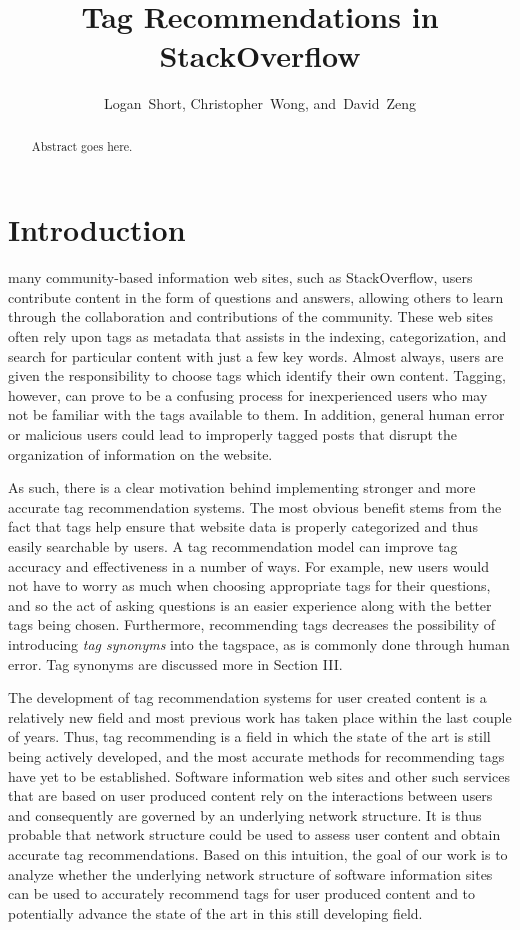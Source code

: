 \documentclass[11pt]{IEEEtran}
\begin{document}
\title{Tag Recommendations in StackOverflow}
\author{Logan~Short, Christopher~Wong, and~David~Zeng}%
\maketitle

\begin{abstract}
Abstract goes here.
\end{abstract}

\section{Introduction}

 many community-based information web sites, such as StackOverflow, users contribute content in the form of questions and answers, allowing others to learn through the collaboration and contributions of the community. These web sites often rely upon tags as metadata that assists in the indexing, categorization, and search for particular content with just a few key words. Almost always, users are given the responsibility to choose tags which identify their own content. Tagging, however, can prove to be a confusing process for inexperienced users who may not be familiar with the tags available to them. In addition, general human error or malicious users could lead to improperly tagged posts that disrupt the organization of information on the website.

As such, there is a clear motivation behind implementing stronger and more accurate tag recommendation systems. The most obvious benefit stems from the fact that tags help ensure that website data is properly categorized and thus easily searchable by users. A tag recommendation model can improve tag accuracy and effectiveness in a number of ways. For example, new users would not have to worry as much when choosing appropriate tags for their questions, and so the act of asking questions is an easier experience along with the better tags being chosen. Furthermore, recommending tags decreases the possibility of introducing \textit{tag synonyms} into the tagspace, as is commonly done through human error. Tag synonyms are discussed more in Section III.

The development of tag recommendation systems for user created content is a relatively new field and most previous work has taken place within the last couple of years. Thus, tag recommending is a field in which the state of the art is still being actively developed, and the most accurate methods for recommending tags have yet to be established. Software information web sites and other such services that are based on user produced content rely on the interactions between users and consequently are governed by an underlying network structure. It is thus probable that network structure could be used to assess user content and obtain accurate tag recommendations. Based on this intuition, the goal of our work is to analyze whether the underlying network structure of software information sites can be used to accurately recommend tags for user produced content and to potentially advance the state of the art in this still developing field.
\end{document}
